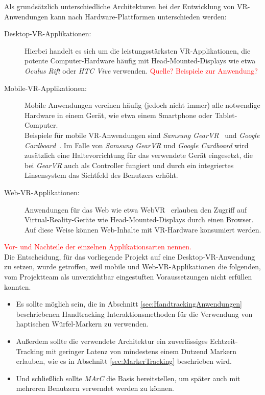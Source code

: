 Als grundsätzlich unterschiedliche Architekturen bei der Entwicklung von VR-An\-wen\-dung\-en kann nach Hardware-Plattformen unterschieden werden:
\begin{description}
	\item[Desktop-VR-Applikationen:] Hierbei handelt es sich um die leistungsstärksten VR-Applikationen, die potente Computer-Hardware häufig mit Head-Mounted-Displays wie etwa \textit{Oculus Rift} oder \textit{HTC Vive} verwenden. \textcolor{red}{Quelle? Beispiele zur Anwendung?}
	\item[Mobile-VR-Applikationen:] Mobile Anwendungen vereinen häufig (jedoch nicht immer) alle notwendige Hardware in einem Gerät, wie etwa einem Smartphone oder Tablet-Computer.\\ Beispiele für mobile VR-Anwendungen sind \textit{Samsung GearVR}~\cite{website:gearVRpressRelease} und \textit{Google Cardboard}~\cite{website:googleCardboard}. Im Falle von \textit{Samsung GearVR} und \textit{Google Cardboard} wird zusätzlich eine Haltevorrichtung für das verwendete Gerät eingesetzt, die bei \textit{GearVR} auch als Controller fungiert und durch ein integriertes Linsensystem das Sichtfeld des Benutzers erhöht.
	\item[Web-VR-Applikationen:] Anwendungen für das Web wie etwa WebVR~\cite{website:webVR} erlauben den Zugriff auf Virtual-Reality-Geräte wie Head-Mounted-Displays durch einen Browser. Auf diese Weise können Web-Inhalte mit VR-Hardware konsumiert werden.
\end{description}

\textcolor{red}{Vor- und Nachteile der einzelnen Applikationsarten nennen.}\\
Die Entscheidung, für das vorliegende Projekt auf eine Desktop-VR-Anwendung zu setzen, wurde getroffen, weil mobile und Web-VR-Applikationen die folgenden, vom Projektteam als unverzichtbar eingestuften Voraussetzungen nicht erfüllen konnten.

\begin{itemize}
	\item Es sollte möglich sein, die in Abschnitt \ref{sec:HandtrackingAnwendungen} beschriebenen Handtracking Interaktionsmethoden für die Verwendung von haptischen Würfel-Markern zu verwenden.
	\item Außerdem sollte die verwendete Architektur ein zuverlässiges Echtzeit-Tracking mit geringer Latenz von mindestens einem Dutzend Markern erlauben, wie es in Abschnitt \ref{sec:MarkerTracking} beschrieben wird.
	\item Und schließlich sollte \emph{MArC} die Basis bereitstellen, um später auch mit mehreren Benutzern verwendet werden zu können.
\end{itemize}

